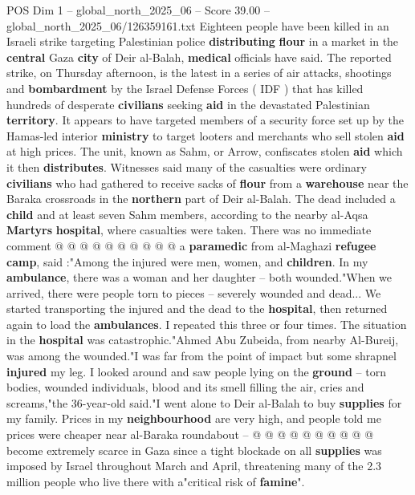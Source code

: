 \begin{textsample}{POS Dim 1 – global\_north\_2025\_06 – Score 39.00 – global\_north\_2025\_06/126359161.txt}  \label{ex:f1_pos_301}
Eighteen people have been killed in an Israeli strike targeting Palestinian police \textbf{distributing} \textbf{flour} in a market in the \textbf{central} Gaza \textbf{city} of Deir al-Balah, \textbf{medical} officials have said.
The reported strike, on Thursday afternoon, is the latest in a series of air attacks, shootings and \textbf{bombardment} by the Israel Defense Forces ( IDF ) that has killed hundreds of desperate \textbf{civilians} seeking \textbf{aid} in the devastated Palestinian \textbf{territory}.
It appears to have targeted members of a security force set up by the Hamas-led interior \textbf{ministry} to target looters and merchants who sell stolen \textbf{aid} at high prices.
The unit, known as Sahm, or Arrow, confiscates stolen \textbf{aid} which it then \textbf{distributes}.
Witnesses said many of the casualties were ordinary \textbf{civilians} who had gathered to receive sacks of \textbf{flour} from a \textbf{warehouse} near the Baraka crossroads in the \textbf{northern} part of Deir al-Balah.
The dead included a \textbf{child} and at least seven Sahm members, according to the nearby al-Aqsa \textbf{Martyrs} \textbf{hospital}, where casualties were taken.
There was no immediate comment @ @ @ @ @ @ @ @ @ @ a \textbf{paramedic} from al-Maghazi \textbf{refugee} \textbf{camp}, said :"Among the injured were men, women, and \textbf{children}.
In my \textbf{ambulance}, there was a woman and her daughter -- both wounded."When we arrived, there were people torn to pieces -- severely wounded and dead...
We started transporting the injured and the dead to the \textbf{hospital}, then returned again to load the \textbf{ambulances}.
I repeated this three or four times.
The situation in the \textbf{hospital} was catastrophic."Ahmed Abu Zubeida, from nearby Al-Bureij, was among the wounded."I was far from the point of impact but some shrapnel \textbf{injured} my leg.
I looked around and saw people lying on the \textbf{ground} -- torn bodies, wounded individuals, blood and its smell filling the air, cries and screams,"the 36-year-old said."I went alone to Deir al-Balah to buy \textbf{supplies} for my family.
Prices in my \textbf{neighbourhood} are very high, and people told me prices were cheaper near al-Baraka roundabout -- @ @ @ @ @ @ @ @ @ @ become extremely scarce in Gaza since a tight blockade on all \textbf{supplies} was imposed by Israel throughout March and April, threatening many of the 2.3 million people who live there with a"critical risk of \textbf{famine}".

\end{textsample}
